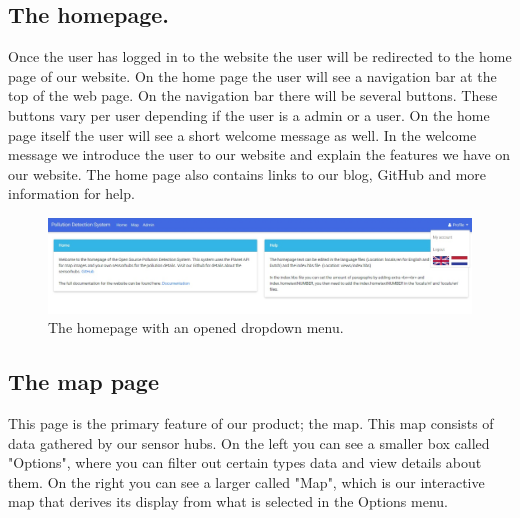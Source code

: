 \documentclass[a4paper]{article}
\begin{document}
\subsection{The homepage.}
Once the user has logged in to the website the user will be redirected to the home page of our website. On the home page the user will see a navigation bar at the top of the web page. On the navigation bar there will be several buttons. These buttons vary per user depending if the user is a admin or a user. 
\newline
\newline
On the home page itself the user will see a short welcome message as well. In the welcome message we introduce the user to our website and explain the features we have on our website. The home page also contains links to our blog, GitHub and more information for help.
\begin{figure}[h!]
  \caption{The homepage with an opened dropdown menu.}
  \centering
  \includegraphics[width=1\textwidth]{home-dropdown}
\end{figure}
\pagebreak

\subsection{The map page}
This page is the primary feature of our product; the map. This map consists of data gathered by our sensor hubs. On the left you can see a smaller box called "Options", where you can filter out certain types data and view details about them. On the right you can see a larger called "Map", which is our interactive map that derives its display from what is selected in the Options menu.
\newline
\end{document}
